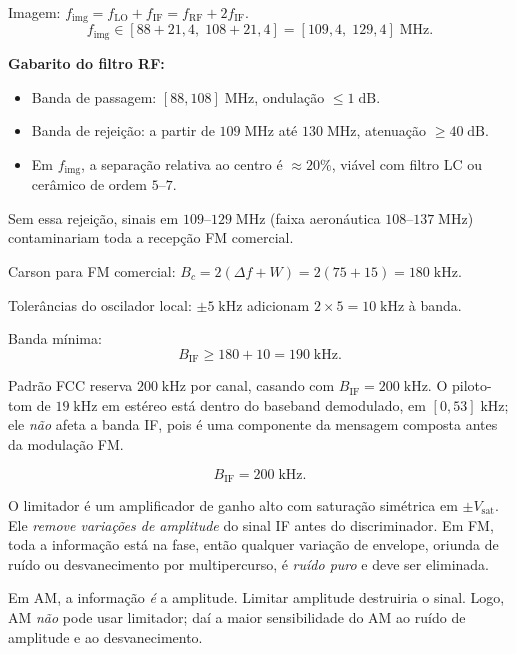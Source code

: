 \documentclass[11pt,a4paper]{article}
\begin{document}
\begin{resolucao}

Imagem: $f_{\text{img}} = f_{\text{LO}} + f_{\text{IF}} = f_{\text{RF}} + 2 f_{\text{IF}}$.
\[
  f_{\text{img}} \in [88 + 21{,}4,\;108 + 21{,}4] = [109{,}4,\;129{,}4]\;\text{MHz}.
\]

\textbf{Gabarito do filtro RF:}
\begin{itemize}\itemsep0pt
  \item Banda de passagem: $[88, 108]\;\text{MHz}$, ondulação $\le 1\;\text{dB}$.
  \item Banda de rejeição: a partir de $109\;\text{MHz}$ até $130\;\text{MHz}$, atenuação $\ge 40\;\text{dB}$.
  \item Em $f_{\text{img}}$, a separação relativa ao centro é $\approx 20\%$, viável com filtro LC ou cerâmico de ordem $5$--$7$.
\end{itemize}

Sem essa rejeição, sinais em $109$--$129\;\text{MHz}$ (faixa aeronáutica $108$--$137\;\text{MHz}$) contaminariam toda a recepção FM comercial.
\end{resolucao}

\begin{resolucao}

Carson para FM comercial: $B_c = 2(\Delta f + W) = 2(75 + 15) = 180\;\text{kHz}$.

Tolerâncias do oscilador local: $\pm 5\;\text{kHz}$ adicionam $2 \times 5 = 10\;\text{kHz}$ à banda.

Banda mínima:
\[
  B_{\text{IF}} \ge 180 + 10 = 190\;\text{kHz}.
\]

Padrão FCC reserva $200\;\text{kHz}$ por canal, casando com $B_{\text{IF}} = 200\;\text{kHz}$. O piloto-tom de $19\;\text{kHz}$ em estéreo está dentro do baseband demodulado, em $[0, 53]\;\text{kHz}$; ele \emph{não} afeta a banda IF, pois é uma componente da mensagem composta antes da modulação FM.

\[
  \boxed{B_{\text{IF}} = 200\;\text{kHz}.}
\]
\end{resolucao}

\begin{resolucao}

O limitador é um amplificador de ganho alto com saturação simétrica em $\pm V_{\text{sat}}$. Ele \emph{remove variações de amplitude} do sinal IF antes do discriminador. Em FM, toda a informação está na fase, então qualquer variação de envelope, oriunda de ruído ou desvanecimento por multipercurso, é \emph{ruído puro} e deve ser eliminada.

Em AM, a informação \emph{é} a amplitude. Limitar amplitude destruiria o sinal. Logo, AM \emph{não} pode usar limitador; daí a maior sensibilidade do AM ao ruído de amplitude e ao desvanecimento.
\end{resolucao}
\end{document}
